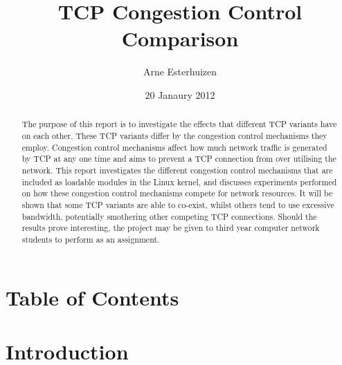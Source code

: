 \documentclass[11pt,a4paper,twocolumn]{article}
\begin{document}
\title{
	TCP Congestion Control Comparison
}
\author{
	Arne Esterhuizen
}
\date{20 Janaury 2012}
\maketitle

\begin{abstract}
The purpose of this report is to investigate the effects that different TCP variants have on each other.
These TCP variants differ by the congestion control mechanisms they employ. Congestion control mechanisms affect
how much network traffic is generated by TCP at any one time and aims to prevent a TCP connection from over utilising
the network. This report investigates the different congestion control mechanisms that are included as loadable
modules in the Linux kernel, and discusses experiments performed on how these congestion control mechanisms compete
for network resources. It will be shown that some TCP variants are able to co-exist, whilst others tend to 
use excessive bandwidth, potentially smothering other competing TCP connections.
Should the results prove interesting, the project may be given to third year computer network students to 
perform as an assignment.
\end{abstract}

\section{Table of Contents}

\section{Introduction}
\label{sec:intro}
\end{document}
